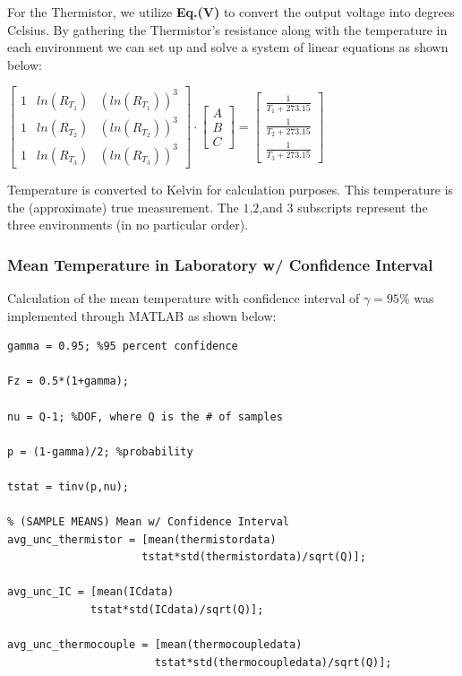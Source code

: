 \documentclass{article}
\begin{document}
For the Thermistor, we utilize \textbf{Eq.(V)} to convert the output voltage into degrees Celsius. By gathering the Thermistor's resistance along with the temperature in each environment we can set up and solve a system of linear equations as shown below:
\begin{center}
    $\begin{bmatrix}
        1 & ln(R_{T_{1}}) & (ln(R_{T_{1}}))^{3}\\[3pt]
        1 & ln(R_{T_{2}}) & (ln(R_{T_{2}}))^{3}\\[3pt]
        1 & ln(R_{T_{3}}) & (ln(R_{T_{3}}))^{3}
    \end{bmatrix}
    \cdot
    \begin{bmatrix}
        A\\[3pt]
        B\\[3pt]
        C
    \end{bmatrix}
    = 
    \begin{bmatrix}
        \frac{1}{T_{1}+273.15}\\[3pt]
            
        \frac{1}{T_{2}+273.15}\\[3pt]
        
        \frac{1}{T_{3}+273.15}
    \end{bmatrix}$
\end{center}

Temperature is converted to Kelvin for calculation purposes. This temperature is the (approximate) true measurement. The $1$,$2$,and $3$ subscripts represent the three environments (in no particular order).

\subsubsection*{Mean Temperature in Laboratory w/ Confidence Interval}
Calculation of the mean temperature with confidence interval of $\gamma = 95\%$ was implemented through MATLAB as shown below:
\begin{lstlisting}[style=Matlab-editor]
% Confidence Interval in Laboratory
gamma = 0.95; %95 percent confidence

Fz = 0.5*(1+gamma);

nu = Q-1; %DOF, where Q is the # of samples

p = (1-gamma)/2; %probability

tstat = tinv(p,nu); 

% (SAMPLE MEANS) Mean w/ Confidence Interval
avg_unc_thermistor = [mean(thermistordata) 
                     tstat*std(thermistordata)/sqrt(Q)];

avg_unc_IC = [mean(ICdata) 
             tstat*std(ICdata)/sqrt(Q)];

avg_unc_thermocouple = [mean(thermocoupledata)  
                       tstat*std(thermocoupledata)/sqrt(Q)];
\end{lstlisting}
\end{document}
